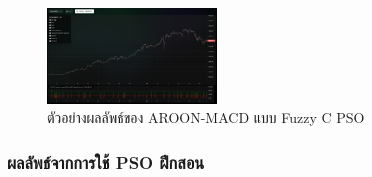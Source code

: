 \begin{figure}[ht]
    \centering
    \includegraphics[width=0.4\textwidth]{images/aroon-macd/example.png}
    \caption{ตัวอย่างผลลัพธ์ของ AROON-MACD แบบ Fuzzy C PSO}
    \label{fig:aroon-macd-example}
\end{figure}

\subsubsection{ผลลัพธ์จากการใช้ PSO ฝึกสอน}
